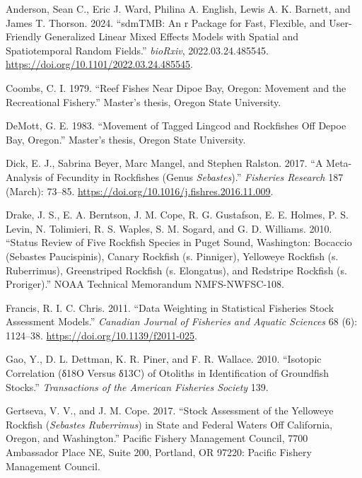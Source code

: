 \documentclass[
]{scrartcl}
\newlength{\cslhangindent}
\newenvironment{CSLReferences}[2] %
 {\begin{list}{}{%
  \setlength{\itemindent}{0pt}
  \setlength{\leftmargin}{0pt}
  \setlength{\parsep}{0pt}
  \ifodd #1
   \setlength{\leftmargin}{\cslhangindent}
   \setlength{\itemindent}{-1\cslhangindent}
  \fi
  \setlength{\itemsep}{#2\baselineskip}}}
 {\end{list}}
\begin{document}
\label{refs}
\begin{CSLReferences}{1}{0}
Anderson, Sean C., Eric J. Ward, Philina A. English, Lewis A. K.
Barnett, and James T. Thorson. 2024. {``sdmTMB: An r Package for Fast,
Flexible, and User-Friendly Generalized Linear Mixed Effects Models with
Spatial and Spatiotemporal Random Fields.''} \emph{bioRxiv},
2022.03.24.485545. \url{https://doi.org/10.1101/2022.03.24.485545}.

Coombs, C. I. 1979. {``Reef Fishes Near Dipoe Bay, Oregon: Movement and
the Recreational Fishery.''} Master's thesis, Oregon State University.

DeMott, G. E. 1983. {``Movement of Tagged Lingcod and Rockfishes Off
Depoe Bay, Oregon.''} Master's thesis, Oregon State University.

Dick, E. J., Sabrina Beyer, Marc Mangel, and Stephen Ralston. 2017. {``A
Meta-Analysis of Fecundity in Rockfishes (Genus \emph{Sebastes}).''}
\emph{Fisheries Research} 187 (March): 73--85.
\url{https://doi.org/10.1016/j.fishres.2016.11.009}.

Drake, J. S., E. A. Berntson, J. M. Cope, R. G. Gustafson, E. E. Holmes,
P. S. Levin, N. Tolimieri, R. S. Waples, S. M. Sogard, and G. D.
Williams. 2010. {``Status Review of Five Rockfish Species in Puget
Sound, Washington: Bocaccio (Sebastes Paucispinis), Canary Rockfish (s.
Pinniger), Yelloweye Rockfish (s. Ruberrimus), Greenstriped Rockfish (s.
Elongatus), and Redstripe Rockfish (s. Proriger).''} NOAA Technical
Memorandum NMFS-NWFSC-108.

Francis, R. I. C. Chris. 2011. {``Data Weighting in Statistical
Fisheries Stock Assessment Models.''} \emph{Canadian Journal of
Fisheries and Aquatic Sciences} 68 (6): 1124--38.
\url{https://doi.org/10.1139/f2011-025}.

Gao, Y., D. L. Dettman, K. R. Piner, and F. R. Wallace. 2010.
{``Isotopic Correlation (δ18O Versus δ13C) of Otoliths in Identification
of Groundfish Stocks.''} \emph{Transactions of the American Fisheries
Society} 139.

Gertseva, V. V., and J. M. Cope. 2017. {``Stock Assessment of the
Yelloweye Rockfish (\emph{{Sebastes} Ruberrimus}) in State and {Federal}
Waters Off {California}, {Oregon}, and {Washington}.''} Pacific Fishery
Management Council, 7700 Ambassador Place NE, Suite 200, Portland, OR
97220: Pacific Fishery Management Council.


\end{CSLReferences}
\end{document}
